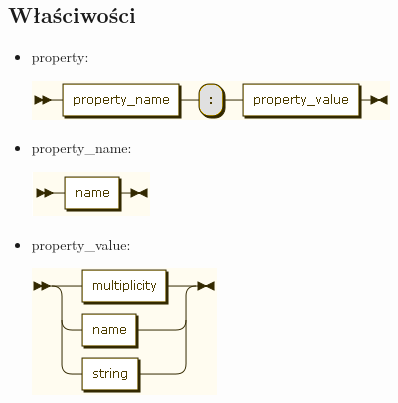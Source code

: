 \subsection{Właściwości}
\begin{itemize}
\item property:

\includegraphics[scale=0.66]{images/grammar/property.png}

\item property\_name:

\includegraphics[scale=0.66]{images/grammar/name_xx.png}

\item property\_value:

\includegraphics[scale=0.66]{images/grammar/property_value.png}
\end{itemize}
